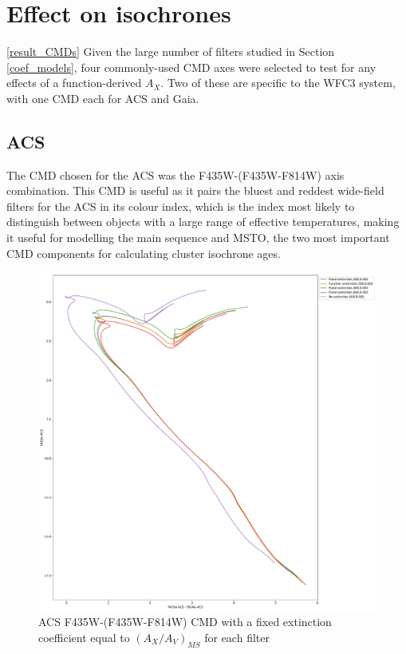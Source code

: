 \documentclass[12pt, a4paper]{report}
\begin{document}
\section{Effect on isochrones} \ref{result_CMDs}
Given the large number of filters studied in Section \ref{coef_models}, four commonly-used CMD axes were selected to test for any effects of a function-derived $A_{X}$. Two of these are specific to the WFC3 system, with one CMD each for ACS and Gaia.

\subsection{ACS} \label{ACS_isoc}
The CMD chosen for the ACS was the F435W-(F435W-F814W) axis combination. This CMD is useful as it pairs the bluest and reddest wide-field filters for the ACS in its colour index, which is the index most likely to distinguish between objects with a large range of effective temperatures, making it useful for modelling the main sequence and MSTO, the two most important CMD components for calculating cluster isochrone ages.

\begin{figure}[h]
\begin{center}
\includegraphics[scale=0.3]{../basti_isochrones_10_13Gyr/Extinction_T5k_FeH0fix_func_f435wACS_f435wACSmf814wACS_500_400_600_Myr_FeH_0p002_ref_noext_Av_1p0.pdf}
\caption{ACS F435W-(F435W-F814W) CMD with a fixed extinction coefficient equal to $(A_{X}/A_{V})_{MS}$ for each filter}
\label{acs_isoc_T5k}
\end{center}
\end{figure}
\end{document}
